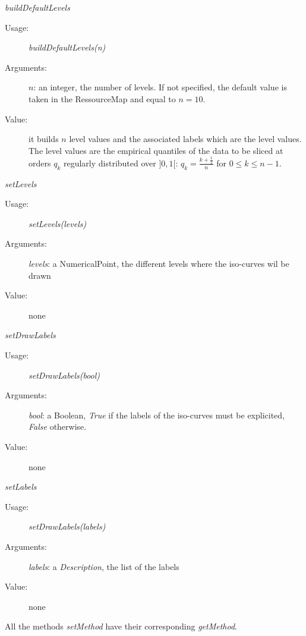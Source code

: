 \begin{description}
\begin{description}
  \item \textit{buildDefaultLevels}
    \begin{description}
    \item[Usage:] \textit{buildDefaultLevels(n)}
    \item[Arguments:] $n$: an integer, the number of levels. If not specified, the default value is taken in the RessourceMap and equal to $n=10$.
    \item[Value:] it builds $n$ level values and the associated labels which are the level values. The level values are the empirical quantiles of the data to be sliced at orders $q_k$ regularly distributed over $]0,1[$: $\displaystyle q_k = \frac{k+\frac{1}{2}}{n}$ for $0 \leq  k \leq n-1$.
    \end{description}
    \bigskip

  \item \textit{setLevels}
    \begin{description}
    \item[Usage:] \textit{setLevels(levels)}
    \item[Arguments:] \textit{levels}: a NumericalPoint, the different levels where the iso-curves wil be drawn
    \item[Value:] none
    \end{description}
    \bigskip

  \item \textit{setDrawLabels}
    \begin{description}
    \item[Usage:] \textit{setDrawLabels(bool)}
    \item[Arguments:] \textit{bool}: a Boolean, \textit{True} if the labels of the iso-curves must be explicited, \textit{False} otherwise.
    \item[Value:] none
    \end{description}
    \bigskip

  \item \textit{setLabels}
    \begin{description}
    \item[Usage:] \textit{setDrawLabels(labels)}
    \item[Arguments:] \textit{labels}: a \textit{Description}, the list of the labels
    \item[Value:] none
    \end{description}
    \bigskip
  \end{description}

  All the methods \textit{setMethod} have their corresponding \textit{getMethod}.

\end{description}


